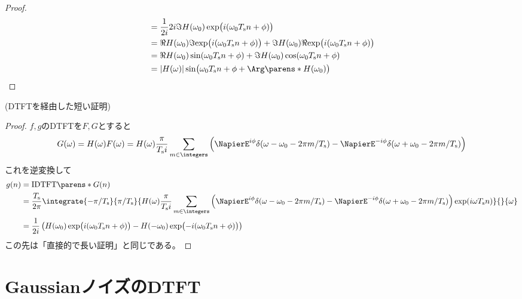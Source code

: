 \begin{proof}
\begin{align*}
                &= \frac{1}{2i}2i\Im{H(\omega_0)\exp\bigl(i(\omega_0\Ts n+\phi)\bigr)} \\
                &= \Re{H(\omega_0)}\Im{\exp\bigl(i(\omega_0\Ts n+\phi)\bigr)} + \Im{H(\omega_0)}\Re{\exp\bigl(i(\omega_0\Ts n+\phi)\bigr)} \\
                &= \Re{H(\omega_0)}\sin(\omega_0\Ts n+\phi) + \Im{H(\omega_0)}\cos(\omega_0\Ts n+\phi) \\
                &= |H(\omega)|\sin\bigl(\omega_0\Ts n+\phi + \Arg\parens*{H(\omega_0)}\bigr)
            \end{align*}
        \end{proof}
        (DTFTを経由した短い証明)
        \begin{proof}
            \quad\par
            $f,g$のDTFTを$F,G$とすると
            \[ G(\omega) = H(\omega)F(\omega) = H(\omega)\frac{\pi}{\Ts i}\sum_{m\in\integers}\left(\NapierE^{i\phi}\delta(\omega-\omega_0 - 2\pi m/\Ts) - \NapierE^{-i\phi}\delta(\omega+\omega_0 - 2\pi m/\Ts)\right) \]
            これを逆変換して
            \begin{align*}
                g(n) &= \IDTFT{G}(n) \\
                &= \frac{\Ts}{2\pi}\integrate{-\pi/\Ts}{\pi/\Ts}{H(\omega)\frac{\pi}{\Ts i}\sum_{m\in\integers}\left(\NapierE^{i\phi}\delta(\omega-\omega_0 - 2\pi m/\Ts) - \NapierE^{-i\phi}\delta(\omega+\omega_0 - 2\pi m/\Ts)\right)\exp(i\omega\Ts n)}{}{\omega} \\
                &= \frac{1}{2i}\left(H(\omega_0)\exp\bigl(i(\omega_0\Ts n+\phi)\bigr) - H(-\omega_0)\exp\bigl(-i(\omega_0\Ts n+\phi)\bigr)\right)
            \end{align*}
            この先は「直接的で長い証明」と同じである。
        \end{proof}
    \section{GaussianノイズのDTFT}
